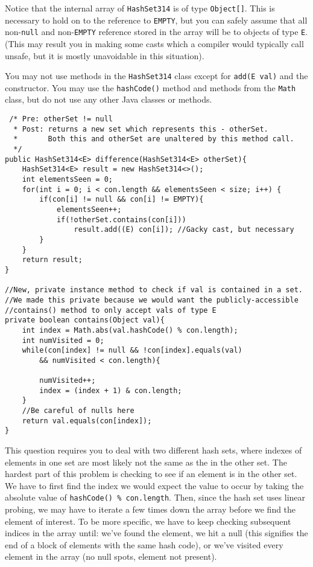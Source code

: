 \documentclass[12pt,letter]{article}
\begin{document}
\vspace{4pt}
\noindent Notice that the internal array of \texttt{HashSet314} is of type \texttt{Object[]}. This is necessary to hold on to the 
reference to \texttt{EMPTY}, but you can safely assume that all non-\texttt{null} and non-\texttt{EMPTY} reference stored in the array
will be to objects of type \texttt{E}. (This may result you in making some casts which a compiler would typically call unsafe, but it is mostly
unavoidable in this situation).

\vspace{4pt}

\noindent You may not use methods in the \texttt{HashSet314} class except for \texttt{add(E val)} and the constructor.
\noindent You may use the \texttt{hashCode()} method and methods from the \texttt{Math} class, but do not use any other Java classes or methods.
\clearpage
\begin{verbatim}
 /* Pre: otherSet != null
  * Post: returns a new set which represents this - otherSet.
  *       Both this and otherSet are unaltered by this method call.
  */
public HashSet314<E> difference(HashSet314<E> otherSet){
    HashSet314<E> result = new HashSet314<>();
    int elementsSeen = 0;
    for(int i = 0; i < con.length && elementsSeen < size; i++) {
        if(con[i] != null && con[i] != EMPTY){
            elementsSeen++;
            if(!otherSet.contains(con[i]))
                result.add((E) con[i]); //Gacky cast, but necessary
        }
    }
    return result;
}

//New, private instance method to check if val is contained in a set.
//We made this private because we would want the publicly-accessible 
//contains() method to only accept vals of type E
private boolean contains(Object val){
    int index = Math.abs(val.hashCode() % con.length);
    int numVisited = 0;
    while(con[index] != null && !con[index].equals(val) 
        && numVisited < con.length){

        numVisited++;
        index = (index + 1) & con.length;
    }
    //Be careful of nulls here
    return val.equals(con[index]);
}
\end{verbatim}

\noindent This question requires you to deal with two different hash sets, where indexes of elements in one set
are most likely not the same as the in the other set. The hardest part of this problem is checking to see 
if an element is in the other set. We have to first find the index we would expect the value to occur by taking
the absolute value of \texttt{hashCode() \% con.length}. Then, since the hash set uses linear probing, we may
have to iterate a few times down the array before we find the element of interest. To be more specific, we have to keep
checking subsequent indices in the array until: we've found the element, we hit a null (this signifies the end of a block of elements
with the same hash code), or we've visited every element in the array (no null spots, element not present).
\vspace{4pt}
\end{document}
